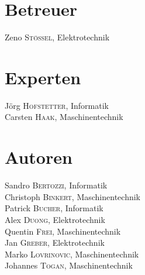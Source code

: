 \begin{multicols}{2}
\section*{Betreuer}
Zeno \textsc{Stössel}, Elektrotechnik
\section*{Experten}
Jörg \textsc{Hofstetter}, Informatik \\
Carsten \textsc{Haak}, Maschinentechnik
\vfill\null
\columnbreak
\section*{Autoren}
Sandro \textsc{Bertozzi}, Informatik \\
Christoph \textsc{Binkert}, Maschinentechnik \\
Patrick \textsc{Bucher}, Informatik \\
Alex \textsc{Duong}, Elektrotechnik \\
Quentin \textsc{Frei}, Maschinentechnik \\
Jan \textsc{Greber}, Elektrotechnik \\
Marko \textsc{Lovrinovic}, Maschinentechnik \\
Johannes \textsc{Togan}, Maschinentechnik
\end{multicols}
